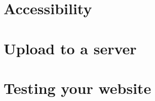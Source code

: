 \documentclass[b5paper,openany]{book}
\begin{document}
\chapter{Accessibility}


\chapter{Upload to a server}


\chapter{Testing your website}





\end{document}
